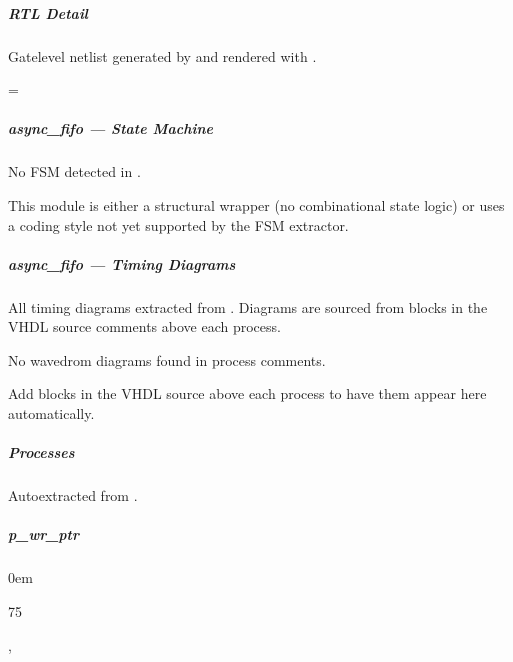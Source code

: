 \documentclass[letterpaper,10pt,english]{sphinxmanual}
\begin{document}
\subparagraph{RTL Detail}
\label{\detokenize{modules/async_fifo/block:rtl-detail}}
\sphinxAtStartPar
Gate\sphinxhyphen{}level netlist generated by  and rendered with .

\begin{landscape}
\makeatletter
\spx@image@maxheight=\dimexpr{}\baselineskip\relax
\makeatother


\end{landscape}

\sphinxstepscope


\subparagraph{async\_fifo — State Machine}
\label{\detokenize{modules/async_fifo/fsm:async-fifo-state-machine}}\label{\detokenize{modules/async_fifo/fsm::doc}}
\sphinxAtStartPar
No FSM detected in .

\sphinxAtStartPar
This module is either a structural wrapper (no combinational
state logic) or uses a coding style not yet supported by the
FSM extractor.

\sphinxstepscope


\subparagraph{async\_fifo — Timing Diagrams}
\label{\detokenize{modules/async_fifo/timing:async-fifo-timing-diagrams}}\label{\detokenize{modules/async_fifo/timing::doc}}
\sphinxAtStartPar
All timing diagrams extracted from .
Diagrams are sourced from  blocks in the VHDL
source comments above each process.

\sphinxAtStartPar
No wavedrom diagrams found in process comments.

\sphinxAtStartPar
Add  blocks in the VHDL source above each
process to have them appear here automatically.

\sphinxstepscope


\subparagraph{Processes}
\label{\detokenize{modules/async_fifo/processes/index:processes}}\label{\detokenize{modules/async_fifo/processes/index::doc}}
\sphinxAtStartPar
Auto\sphinxhyphen{}extracted from .

\sphinxstepscope


\subparagraph{p\_wr\_ptr}
\label{\detokenize{modules/async_fifo/processes/p_wr_ptr:p-wr-ptr}}\label{\detokenize{modules/async_fifo/processes/p_wr_ptr::doc}}
\begin{DUlineblock}{0em}
\item[]  
\item[]  75
\item[]  
\item[]  , 
\end{DUlineblock}
\end{document}

